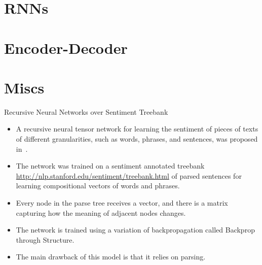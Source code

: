 \documentclass[handout]{beamer}
\begin{document}
\section{RNNs}



\section{Encoder-Decoder}


\section{Miscs}


\begin{frame}{Recursive Neural Networks over Sentiment Treebank}
\begin{scriptsize}
\begin{itemize}
\item A recursive neural tensor network for learning the sentiment of pieces of texts of different granularities, such as words, phrases, and sentences, was proposed in~\cite{socher2013recursive}.
\item The network was trained on a sentiment annotated treebank \url{http://nlp.stanford.edu/sentiment/treebank.html} of parsed sentences for learning compositional vectors of words and phrases.
\item Every node in the parse tree receives a vector, and there is a matrix capturing how the meaning of adjacent nodes changes. 
\item The network is trained using a variation of backpropagation called Backprop through Structure.
\item The main drawback of this model is that it relies on parsing.
\end{itemize}
\end{scriptsize}
\end{frame}
\end{document}
